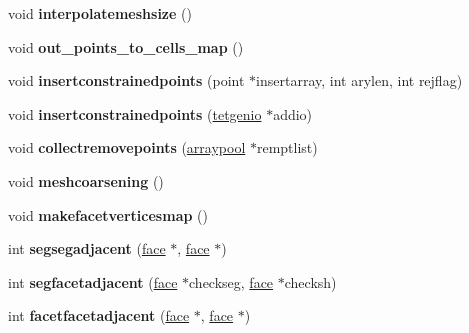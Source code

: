 \begin{DoxyCompactItemize}
void {\bfseries interpolatemeshsize} ()
\item 
\mbox{\label{classtetgenmesh_a906c4778205f16c7504f6856168c12b7}} 
void {\bfseries out\+\_\+points\+\_\+to\+\_\+cells\+\_\+map} ()
\item 
\mbox{\label{classtetgenmesh_ac8205cae8e16f490b80d74975934ff74}} 
void {\bfseries insertconstrainedpoints} (point $\ast$insertarray, int arylen, int rejflag)
\item 
\mbox{\label{classtetgenmesh_ab859365ca3dd3eafb77fac56d0ae3a03}} 
void {\bfseries insertconstrainedpoints} (\hyperlink{classtetgenio}{tetgenio} $\ast$addio)
\item 
\mbox{\label{classtetgenmesh_add13a24cf325595ef693dca96f81470c}} 
void {\bfseries collectremovepoints} (\hyperlink{classtetgenmesh_1_1arraypool}{arraypool} $\ast$remptlist)
\item 
\mbox{\label{classtetgenmesh_a85e17b620820cbcb6cb47b565f822062}} 
void {\bfseries meshcoarsening} ()
\item 
\mbox{\label{classtetgenmesh_afa650c7021f3c73cf786d3f7fa687ed7}} 
void {\bfseries makefacetverticesmap} ()
\item 
\mbox{\label{classtetgenmesh_a15f22ccbe981fc0d0eb4342a3c75d515}} 
int {\bfseries segsegadjacent} (\hyperlink{classtetgenmesh_1_1face}{face} $\ast$, \hyperlink{classtetgenmesh_1_1face}{face} $\ast$)
\item 
\mbox{\label{classtetgenmesh_adf193bbe36f5075b209f0d71fc74a18b}} 
int {\bfseries segfacetadjacent} (\hyperlink{classtetgenmesh_1_1face}{face} $\ast$checkseg, \hyperlink{classtetgenmesh_1_1face}{face} $\ast$checksh)
\item 
\mbox{\label{classtetgenmesh_a60303418c35324c87dfa1fcb3b160708}} 
int {\bfseries facetfacetadjacent} (\hyperlink{classtetgenmesh_1_1face}{face} $\ast$, \hyperlink{classtetgenmesh_1_1face}{face} $\ast$)
\item 
\mbox{\label{classtetgenmesh_a238e8df1d6dc7f547bc5a59c6b45eed5}} 

\end{DoxyCompactItemize}
